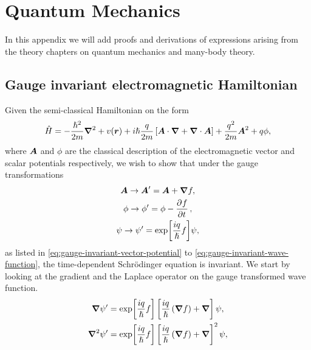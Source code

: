 \chapter{Quantum Mechanics}
    In this appendix we will add proofs and derivations of expressions arising
    from the theory chapters on quantum mechanics and many-body theory.

    \section{Gauge invariant electromagnetic Hamiltonian}
        \label{app:gauge-invariant-electromagnetic-hamiltonian}
        Given the semi-classical Hamiltonian on the form
        \begin{align}
            \hat{H}
            = -\frac{\hslash^2}{2m}\boldsymbol{\nabla}^2
            + v(\boldsymbol{r})
            + i\hslash\frac{q}{2m}\left[ 
                \boldsymbol{A}\cdot\boldsymbol{\nabla}
                + \boldsymbol{\nabla}\cdot\boldsymbol{A}
             \right]
            + \frac{q^2}{2m}\boldsymbol{A}^2
            + q\phi,
        \end{align}
        where $\boldsymbol{A}$ and $\phi$ are the classical description of the
        electromagnetic vector and scalar potentials respectively, we wish to
        show that under the gauge transformations
        \begin{gather}
            \vfg{A} \to \vfg{A}' = \vfg{A} + \vfg{\nabla}f,
            \\
            \phi \to \phi' = \phi - \dpd{f}{t},
            \\
            \psi \to \psi' = \exp[\frac{iq}{\hslash}f]\psi,
        \end{gather}
        as listed in \autoref{eq:gauge-invariant-vector-potential} to
        \autoref{eq:gauge-invariant-wave-function}, the time-dependent
        Schrödinger equation is invariant.
        We start by looking at the gradient and the Laplace operator on the
        gauge transformed wave function.
        \begin{gather}
            \boldsymbol{\nabla}\psi'
            = \exp[\frac{iq}{\hslash} f]\left[ 
                \frac{iq}{\hslash}\left( \boldsymbol{\nabla}f \right)
                + \boldsymbol{\nabla}
             \right]\psi, \\
            \boldsymbol{\nabla}^2\psi'
            = \exp[\frac{iq}{\hslash} f]\left[ 
                \frac{iq}{\hslash}\left( \boldsymbol{\nabla}f \right)
                + \boldsymbol{\nabla}
             \right]^2\psi, \\
        \end{gather}
